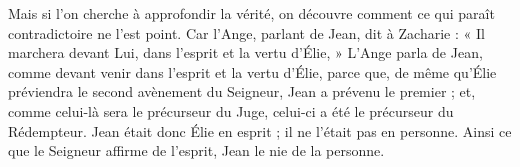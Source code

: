 Mais si l’on cherche à approfondir la vérité, on découvre comment ce qui paraît contradictoire ne l’est point. Car l’Ange, parlant de Jean, dit à Zacharie : « Il marchera devant Lui, dans l’esprit et la vertu d’Élie, » L’Ange parla de Jean, comme devant venir dans l’esprit et la vertu d’Élie, parce que, de même qu’Élie préviendra le second avènement du Seigneur, Jean a prévenu le premier ; et, comme celui-là sera le précurseur du Juge, celui-ci a été le précurseur du Rédempteur. Jean était donc Élie en esprit ; il ne l’était pas en personne. Ainsi ce que le Seigneur affirme de l’esprit, Jean le nie de la personne.